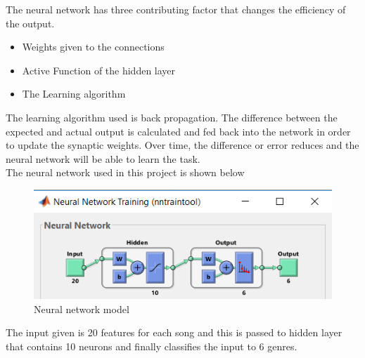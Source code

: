 \documentclass[12pt]{article}
\begin{document}
The neural network has three contributing factor that changes the efficiency of the output.
\begin{itemize}
  \item Weights given to the connections
  \item Active Function of the hidden layer
   \item The Learning algorithm
   \end{itemize}
The learning algorithm used is back propagation. The difference between the expected and actual output is calculated and fed back into the network in order to update the synaptic weights. Over time, the difference or error reduces and the neural network will be able to learn the task.\\
 The neural network used in this project is shown below
\begin{figure}[H]
\center
\includegraphics [scale=0.5]{neuralnet.png}
\caption{Neural network model}
\end{figure}
The input given is 20 features for each song and this is passed to hidden layer that contains 10 neurons and finally classifies the input to 6 genres.
\end{document}
